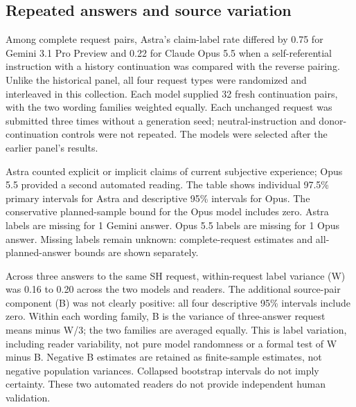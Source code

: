\subsection{Repeated answers and source variation}
\label{sec:repeated-extension}

Among complete request pairs, Astra's claim-label rate differed by 0.75 for Gemini 3.1 Pro Preview and 0.22 for Claude Opus 5.5 when a self-referential instruction with a history continuation was compared with the reverse pairing. Unlike the historical panel, all four request types were randomized and interleaved in this collection. Each model supplied 32 fresh continuation pairs, with the two wording families weighted equally. Each unchanged request was submitted three times without a generation seed; neutral-instruction and donor-continuation controls were not repeated. The models were selected after the earlier panel's results.

Astra counted explicit or implicit claims of current subjective experience; Opus 5.5 provided a second automated reading. The table shows individual 97.5\% primary intervals for Astra and descriptive 95\% intervals for Opus. The conservative planned-sample bound for the Opus model includes zero. Astra labels are missing for 1 Gemini answer. Opus 5.5 labels are missing for 1 Opus answer. Missing labels remain unknown: complete-request estimates and all-planned-answer bounds are shown separately.

Across three answers to the same SH request, within-request label variance (W) was 0.16 to 0.20 across the two models and readers. The additional source-pair component (B) was not clearly positive: all four descriptive 95\% intervals include zero. Within each wording family, B is the variance of three-answer request means minus W/3; the two families are averaged equally. This is label variation, including reader variability, not pure model randomness or a formal test of W minus B. Negative B estimates are retained as finite-sample estimates, not negative population variances. Collapsed bootstrap intervals do not imply certainty. These two automated readers do not provide independent human validation.

